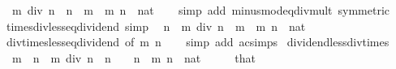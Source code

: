 \begin{isabellebody}
\ \ {\isachardoublequoteopen}m\ div\ n\ {\isacharasterisk}{\kern0pt}\ n\ {\isasymle}\ m{\isachardoublequoteclose}\ \ m\ n\ {\isacharcolon}{\kern0pt}{\isacharcolon}{\kern0pt}\ nat\isanewline
%
\isadelimproof
\ \ %
\endisadelimproof
%
\isatagproof
{}\isamarkupfalse%
\ {\isacharparenleft}{\kern0pt}simp\ add{\isacharcolon}{\kern0pt}\ minus{\isacharunderscore}{\kern0pt}mod{\isacharunderscore}{\kern0pt}eq{\isacharunderscore}{\kern0pt}div{\isacharunderscore}{\kern0pt}mult\ {\isacharbrackleft}{\kern0pt}symmetric{\isacharbrackright}{\kern0pt}{\isacharparenright}{\kern0pt}%
\endisatagproof
{\isafoldproof}%
%
\isadelimproof
\isanewline
%
\endisadelimproof
\isanewline
{}\isamarkupfalse%
\ times{\isacharunderscore}{\kern0pt}div{\isacharunderscore}{\kern0pt}less{\isacharunderscore}{\kern0pt}eq{\isacharunderscore}{\kern0pt}dividend\ {\isacharbrackleft}{\kern0pt}simp{\isacharbrackright}{\kern0pt}{\isacharcolon}{\kern0pt}\isanewline
\ \ {\isachardoublequoteopen}n\ {\isacharasterisk}{\kern0pt}\ {\isacharparenleft}{\kern0pt}m\ div\ n{\isacharparenright}{\kern0pt}\ {\isasymle}\ m{\isachardoublequoteclose}\ \ m\ n\ {\isacharcolon}{\kern0pt}{\isacharcolon}{\kern0pt}\ nat\isanewline
%
\isadelimproof
\ \ %
\endisadelimproof
%
\isatagproof
{}\isamarkupfalse%
\ div{\isacharunderscore}{\kern0pt}times{\isacharunderscore}{\kern0pt}less{\isacharunderscore}{\kern0pt}eq{\isacharunderscore}{\kern0pt}dividend\ {\isacharbrackleft}{\kern0pt}of\ m\ n{\isacharbrackright}{\kern0pt}\isanewline
\ \ \isamarkupfalse%
\ {\isacharparenleft}{\kern0pt}simp\ add{\isacharcolon}{\kern0pt}\ ac{\isacharunderscore}{\kern0pt}simps{\isacharparenright}{\kern0pt}%
\endisatagproof
{\isafoldproof}%
%
\isadelimproof
\isanewline
%
\endisadelimproof
\isanewline
{}\isamarkupfalse%
\ dividend{\isacharunderscore}{\kern0pt}less{\isacharunderscore}{\kern0pt}div{\isacharunderscore}{\kern0pt}times{\isacharcolon}{\kern0pt}\isanewline
\ \ {\isachardoublequoteopen}m\ {\isacharless}{\kern0pt}\ n\ {\isacharplus}{\kern0pt}\ {\isacharparenleft}{\kern0pt}m\ div\ n{\isacharparenright}{\kern0pt}\ {\isacharasterisk}{\kern0pt}\ n{\isachardoublequoteclose}\ \ {\isachardoublequoteopen}{}\ {\isacharless}{\kern0pt}\ n{\isachardoublequoteclose}\ \ m\ n\ {\isacharcolon}{\kern0pt}{\isacharcolon}{\kern0pt}\ nat\isanewline
%
\isadelimproof
%
\endisadelimproof
%
\isatagproof
{}\isamarkupfalse%
\ {\isacharminus}{\kern0pt}\isanewline
\ \ \isamarkupfalse%
\ that\ \isamarkupfalse%

\end{isabellebody}
